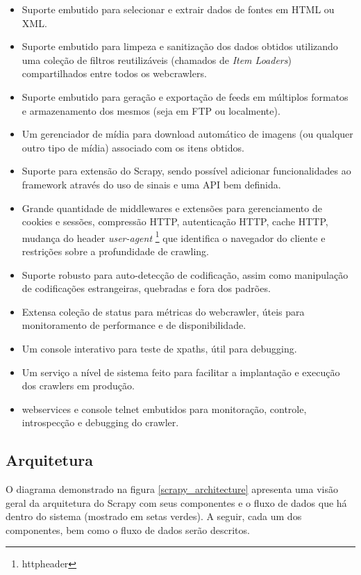 \begin{itemize}
	\item Suporte embutido para selecionar e extrair dados de fontes em HTML ou XML.
	\item Suporte embutido para limpeza e sanitização dos dados obtidos utilizando uma coleção de filtros reutilizáveis (chamados de \emph{Item Loaders}) compartilhados entre todos os \glspl{webcrawler}.
	\item Suporte embutido para geração e exportação de \glspl{feed} em múltiplos formatos e armazenamento dos mesmos (seja em FTP ou localmente).
	\item Um gerenciador de mídia para download automático de imagens (ou qualquer outro tipo de mídia) associado com os itens obtidos.
	\item Suporte para extensão do Scrapy, sendo possível adicionar funcionalidades ao framework através do uso de sinais e uma API bem definida.
	\item Grande quantidade de \glspl{middleware} e extensões para gerenciamento de cookies e sessões, compressão HTTP, autenticação HTTP, cache HTTP, mudança do header \emph{user-agent} \footnote{\Gls{httpheader}} que identifica o navegador do cliente e restrições sobre a profundidade de \gls{crawling}.
	\item Suporte robusto para auto-detecção de codificação, assim como manipulação de codificações estrangeiras, quebradas e fora dos padrões.
	\item Extensa coleção de status para métricas do \gls{webcrawler}, úteis para monitoramento de performance e de disponibilidade.
	\item Um console interativo para teste de \glspl{xpath}, útil para \gls{debugging}.
	\item Um serviço a nível de sistema feito para facilitar a implantação e execução dos crawlers em produção.
	\item \Glspl{webservice} e console telnet embutidos para monitoração, controle, introspecção e \gls{debugging} do crawler.
\end{itemize}

\subsection{Arquitetura}

O diagrama demonstrado na figura \ref{scrapy_architecture} apresenta uma visão geral da arquitetura do Scrapy com seus componentes e o fluxo de dados que há dentro do sistema (mostrado em setas verdes). A seguir, cada um dos componentes, bem como o fluxo de dados serão descritos.

